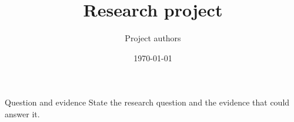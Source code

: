 \documentclass{beamer}
\title{Research project}
\author{Project authors}
\date{\today}
\begin{document}
\begin{frame}
\titlepage
\end{frame}
\begin{frame}{Question and evidence}
State the research question and the evidence that could answer it.
\end{frame}
\end{document}
